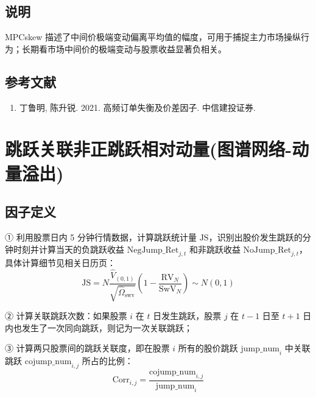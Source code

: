 \documentclass{article}
\begin{document}
\subsection{说明}
MPCskew 描述了中间价极端变动偏离平均值的幅度，可用于捕捉主力市场操纵行为；长期看市场中间价的极端变动与股票收益显著负相关。

\subsection{参考文献}
\begin{enumerate}
    \item 丁鲁明, 陈升锐. 2021. 高频订单失衡及价差因子. 中信建投证券.
\end{enumerate}

\section{跳跃关联非正跳跃相对动量(图谱网络-动量溢出)}

\subsection{因子定义}

① 利用股票日内 5 分钟行情数据，计算跳跃统计量 \( \mathrm{JS} \)，识别出股价发生跳跃的分钟时刻并计算当天的负跳跃收益 \( \mathrm{NegJump\_Ret}_{j,t} \) 和非跳跃收益 \( \mathrm{NoJump\_Ret}_{j,t} \)，具体计算细节见相关日历页：
\begin{equation}
    \mathrm{JS} = N \frac{\hat{V}_{(0,1)}}{\sqrt{\hat{\Omega}_{\mathrm{swv}}}} \left( 1 - \frac{\mathrm{RV}_N}{\mathrm{SwV}_N} \right) \sim N(0,1)
\end{equation}

② 计算关联跳跃次数：如果股票 \( i \) 在 \( t \) 日发生跳跃，股票 \( j \) 在 \( t-1 \) 日至 \( t+1 \) 日内也发生了一次同向跳跃，则记为一次关联跳跃；

③ 计算两只股票间的跳跃关联度，即在股票 \( i \) 所有的股价跳跃 \( \mathrm{jump\_num}_i \) 中关联跳跃 \( \mathrm{cojump\_num}_{i,j} \) 所占的比例：
\begin{equation}
    \mathrm{Corr}_{i,j} = \frac{\mathrm{cojump\_num}_{i,j}}{\mathrm{jump\_num}_i}
\end{equation}
\end{document}
